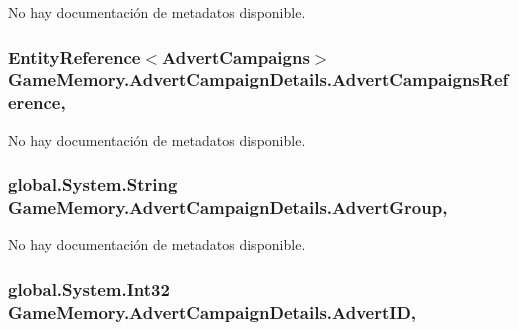 No hay documentación de metadatos disponible. 

\hypertarget{class_game_memory_1_1_advert_campaign_details_aa7b63926aba9be6e0a00d3f3f666f13c}{
\subsubsection[{Advert\-Campaigns\-Reference}]{\setlength{\rightskip}{0pt plus 5cm}Entity\-Reference$<${\bf Advert\-Campaigns}$>$ Game\-Memory.\-Advert\-Campaign\-Details.\-Advert\-Campaigns\-Reference\hspace{0.3cm}{\ttfamily [get]}, {\ttfamily [set]}}}\label{class_game_memory_1_1_advert_campaign_details_aa7b63926aba9be6e0a00d3f3f666f13c}


No hay documentación de metadatos disponible. 

\hypertarget{class_game_memory_1_1_advert_campaign_details_a95b6b6def95516b545e5ba17431a1a6e}{
\subsubsection[{Advert\-Group}]{\setlength{\rightskip}{0pt plus 5cm}global.\-System.\-String Game\-Memory.\-Advert\-Campaign\-Details.\-Advert\-Group\hspace{0.3cm}{\ttfamily [get]}, {\ttfamily [set]}}}\label{class_game_memory_1_1_advert_campaign_details_a95b6b6def95516b545e5ba17431a1a6e}


No hay documentación de metadatos disponible. 

\hypertarget{class_game_memory_1_1_advert_campaign_details_a322157e3435d7d1ff384fc2fc60b5656}{
\subsubsection[{Advert\-I\-D}]{\setlength{\rightskip}{0pt plus 5cm}global.\-System.\-Int32 Game\-Memory.\-Advert\-Campaign\-Details.\-Advert\-I\-D\hspace{0.3cm}{\ttfamily [get]}, {\ttfamily [set]}}}\label{class_game_memory_1_1_advert_campaign_details_a322157e3435d7d1ff384fc2fc60b5656}


